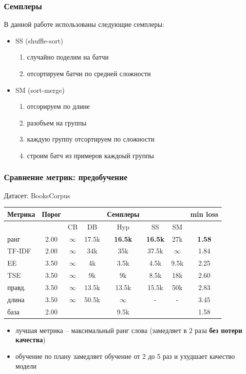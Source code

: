 \documentclass{beamer}
\begin{document}
\begin{frame}
	\frametitle{Семплеры}
	В данной работе использованы следующие семплеры:
	
	\begin{itemize}
		\item SS (shuffle-sort)
			\begin{enumerate}
				\item случайно поделим на батчи
				\item отсортируем батчи по средней сложности
			\end{enumerate}
		
		\item SM (sort-merge)
			\begin{enumerate}
				\item отсорируем по длине
				\item разобъем на группы
				\item каждую группу отсортируем по сложности
				\item строим батч из примеров каждоый группы
			\end{enumerate}
	\end{itemize}
\end{frame}

\begin{frame}
	\frametitle{Сравнение метрик: предобучение}
	\let\thefootnote\relax{}
	
	Датасет: BooksCorpus
	
	\begin{table}
		\begin{tabular}{|l|c|ccccc|c|}
			\hline
			Метрика & Порог & & & Семплеры & & & min loss \\
			\hline
			& & CB & DB & Hyp & SS & SM & \\
			\hline
			ранг & 2.00 & $\infty$ & 17.5k & {\bf 16.5k} & {\bf 16.5k} & 27k & {\bf 1.58} \\
			TF-IDF & 2.00 & $\infty$ & 34k & 35k & 37.5k & $\infty$ & 1.84 \\
			\hline
			\hline
			EE & 3.50 & $\infty$ & 4k & 3.5k & 4.5k & 9.5k & 2.25 \\
			TSE & 3.50 & $\infty$ & 9k & 9k & 8.5k & 18k & 2.60 \\
			правд. & 3.50 & $\infty$ & 13.5k & 13.5k & 15.5k & 50k & 2.83 \\
			длина & 3.50 & $\infty$ & 50.5k & $\infty$ & - & - & 3.45 \\
			\hline
			база & 2.00 & & & 9.5k & & & 1.58 \\
			\hline
		\end{tabular}
	\end{table}
	\begin{itemize}
		\item лучшая метрика -- максимальный ранг слова (замедляет в $2$ раза  {\bf без потери качества})
		\item обучение по плану замедляет обучение от 2 до 5 раз и ухудшает качество модели
	\end{itemize}
\end{frame}
\end{document}
